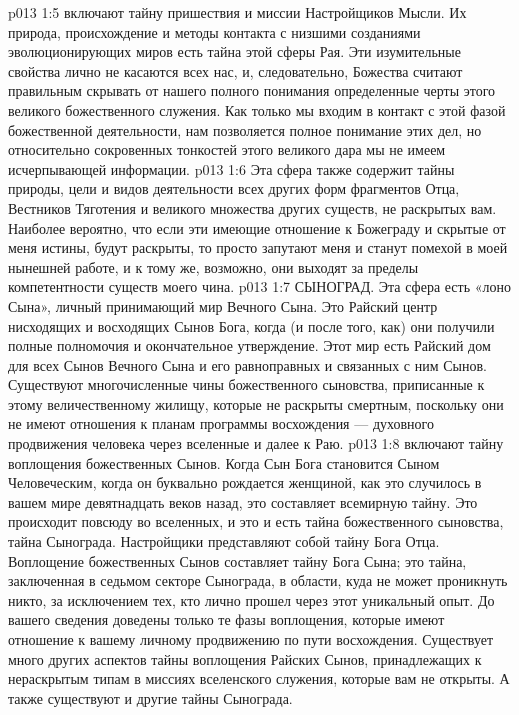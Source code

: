 \vs p013 1:5 \pc {} включают тайну пришествия и миссии Настройщиков Мысли. Их природа, происхождение и методы контакта с низшими созданиями эволюционирующих миров есть тайна этой сферы Рая. Эти изумительные свойства лично не касаются всех нас, и, следовательно, Божества считают правильным скрывать от нашего полного понимания определенные черты этого великого божественного служения. Как только мы входим в контакт с этой фазой божественной деятельности, нам позволяется полное понимание этих дел, но относительно сокровенных тонкостей этого великого дара мы не имеем исчерпывающей информации.
\vs p013 1:6 Эта сфера также содержит тайны природы, цели и видов деятельности всех других форм фрагментов Отца, Вестников Тяготения и великого множества других существ, не раскрытых вам. Наиболее вероятно, что если эти имеющие отношение к Божеграду и скрытые от меня истины, будут раскрыты, то просто запутают меня и станут помехой в моей нынешней работе, и к тому же, возможно, они выходят за пределы компетентности существ моего чина.
\vs p013 1:7 \pc {}\bibnobreakspace СЫНОГРАД. Эта сфера есть «лоно Сына», личный принимающий мир Вечного Сына. Это Райский центр нисходящих и восходящих Сынов Бога, когда (и после того, как) они получили полные полномочия и окончательное утверждение. Этот мир есть Райский дом для всех Сынов Вечного Сына и его равноправных и связанных с ним Сынов. Существуют многочисленные чины божественного сыновства, приписанные к этому величественному жилищу, которые не раскрыты смертным, поскольку они не имеют отношения к планам программы восхождения --- духовного продвижения человека через вселенные и далее к Раю.
\vs p013 1:8 \pc {} включают тайну воплощения божественных Сынов. Когда Сын Бога становится Сыном Человеческим, когда он буквально рождается женщиной, как это случилось в вашем мире девятнадцать веков назад, это составляет всемирную тайну. Это происходит повсюду во вселенных, и это и есть тайна божественного сыновства, тайна Сынограда. Настройщики представляют собой тайну Бога Отца. Воплощение божественных Сынов составляет тайну Бога Сына; это тайна, заключенная в седьмом секторе Сынограда, в области, куда не может проникнуть никто, за исключением тех, кто лично прошел через этот уникальный опыт. До вашего сведения доведены только те фазы воплощения, которые имеют отношение к вашему личному продвижению по пути восхождения. Существует много других аспектов тайны воплощения Райских Сынов, принадлежащих к нераскрытым типам в миссиях вселенского служения, которые вам не открыты. А также существуют и другие тайны Сынограда.
